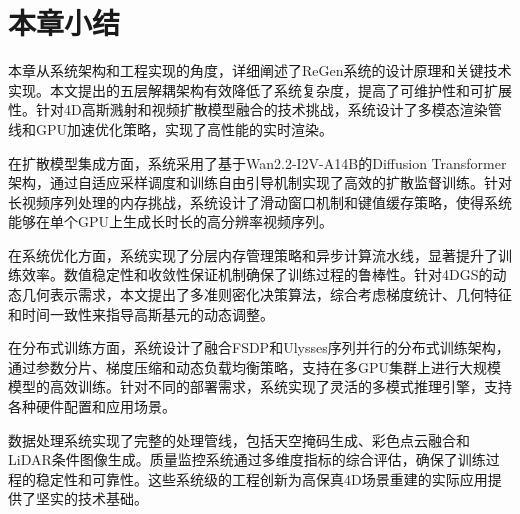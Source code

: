 \section{本章小结}

本章从系统架构和工程实现的角度，详细阐述了ReGen系统的设计原理和关键技术实现。本文提出的五层解耦架构有效降低了系统复杂度，提高了可维护性和可扩展性。针对4D高斯溅射和视频扩散模型融合的技术挑战，系统设计了多模态渲染管线和GPU加速优化策略，实现了高性能的实时渲染。

在扩散模型集成方面，系统采用了基于Wan2.2-I2V-A14B的Diffusion Transformer架构，通过自适应采样调度和训练自由引导机制实现了高效的扩散监督训练。针对长视频序列处理的内存挑战，系统设计了滑动窗口机制和键值缓存策略，使得系统能够在单个GPU上生成长时长的高分辨率视频序列。

在系统优化方面，系统实现了分层内存管理策略和异步计算流水线，显著提升了训练效率。数值稳定性和收敛性保证机制确保了训练过程的鲁棒性。针对4DGS的动态几何表示需求，本文提出了多准则密化决策算法，综合考虑梯度统计、几何特征和时间一致性来指导高斯基元的动态调整。

在分布式训练方面，系统设计了融合FSDP和Ulysses序列并行的分布式训练架构，通过参数分片、梯度压缩和动态负载均衡策略，支持在多GPU集群上进行大规模模型的高效训练。针对不同的部署需求，系统实现了灵活的多模式推理引擎，支持各种硬件配置和应用场景。

数据处理系统实现了完整的处理管线，包括天空掩码生成、彩色点云融合和LiDAR条件图像生成。质量监控系统通过多维度指标的综合评估，确保了训练过程的稳定性和可靠性。这些系统级的工程创新为高保真4D场景重建的实际应用提供了坚实的技术基础。
